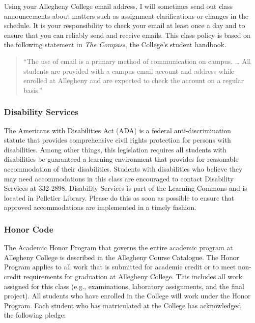 Using your Allegheny College email address, I will sometimes send out class announcements about matters such as
assignment clarifications or changes in the schedule. It is your responsibility to check your email at least once a day
and to ensure that you can reliably send and receive emails. This class policy is based on the following statement in
{\em The Compass}, the College's student handbook.

\begin{quote}
``The use of email is a primary method of communication on campus. \ldots
All students are provided with a campus email account and address while
enrolled at Allegheny and are expected to check the account on a regular
basis.''
\end{quote}
\vspace*{-.15in}

\subsubsection*{Disability Services}

The Americans with Disabilities Act (ADA) is a federal anti-discrimination statute that provides comprehensive civil
rights protection for persons with disabilities.  Among other things, this legislation requires all students with
disabilities be guaranteed a learning environment that provides for reasonable accommodation of their disabilities.
Students with disabilities who believe they may need accommodations in this class are encouraged to contact Disability
Services at 332-2898.  Disability Services is part of the Learning Commons and is located in Pelletier Library.
Please do this as soon as possible to ensure that approved accommodations are implemented in a timely fashion.

\subsubsection*{Honor Code}

The Academic Honor Program that governs the entire academic program at Allegheny College is described in the Allegheny
Course Catalogue.  The Honor Program applies to all work that is submitted for academic credit or to meet non-credit
requirements for graduation at Allegheny College.  This includes all work assigned for this class (e.g., examinations,
laboratory assignments, and the final project).  All students who have enrolled in the College will work under the Honor
Program.  Each student who has matriculated at the College has acknowledged the following pledge:

